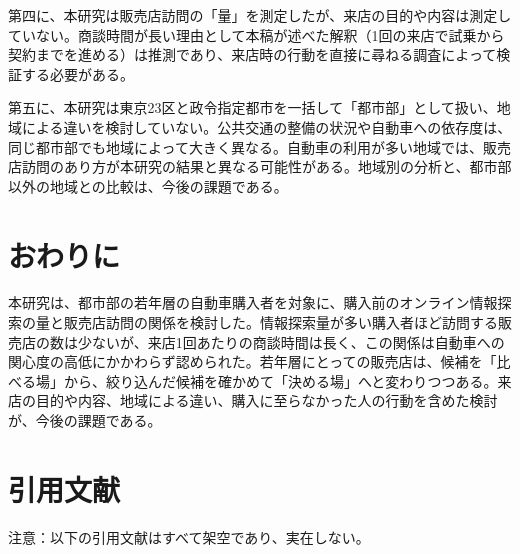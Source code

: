 第四に、本研究は販売店訪問の「量」を測定したが、来店の目的や内容は測定していない。商談時間が長い理由として本稿が述べた解釈（1回の来店で試乗から契約までを進める）は推測であり、来店時の行動を直接に尋ねる調査によって検証する必要がある。

第五に、本研究は東京23区と政令指定都市を一括して「都市部」として扱い、地域による違いを検討していない。公共交通の整備の状況や自動車への依存度は、同じ都市部でも地域によって大きく異なる。自動車の利用が多い地域では、販売店訪問のあり方が本研究の結果と異なる可能性がある。地域別の分析と、都市部以外の地域との比較は、今後の課題である。

\section{おわりに}

本研究は、都市部の若年層の自動車購入者を対象に、購入前のオンライン情報探索の量と販売店訪問の関係を検討した。情報探索量が多い購入者ほど訪問する販売店の数は少ないが、来店1回あたりの商談時間は長く、この関係は自動車への関心度の高低にかかわらず認められた。若年層にとっての販売店は、候補を「比べる場」から、絞り込んだ候補を確かめて「決める場」へと変わりつつある。来店の目的や内容、地域による違い、購入に至らなかった人の行動を含めた検討が、今後の課題である。

\newpage
\section*{引用文献}

{\footnotesize\color{bad}\sffamily 注意：以下の引用文献はすべて架空であり、実在しない。}

